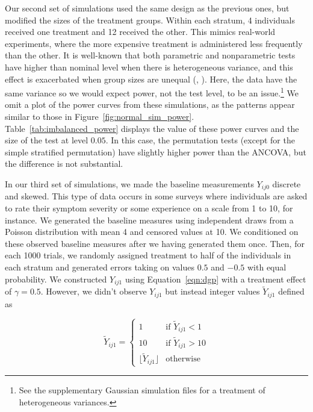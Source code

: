 \documentclass[11pt]{article}
\begin{document}
Our second set of simulations used the same design as the previous ones, but modified the sizes of the treatment groups.
Within each stratum, 4 individuals received one treatment and 12 received the other.
This mimics real-world experiments, where the more expensive treatment is administered less frequently than the other.
It is well-known that both parametric and nonparametric tests have higher than nominal level when there is heterogeneous variance, and this effect is exacerbated when group sizes are unequal (\cite{glass_consequences_1972}, \cite{zimmerman_two_2006}).
Here, the data have the same variance so we would expect power, not the test level, to be an issue.\footnote{
See the supplementary Gaussian simulation files for a treatment of heterogeneous variances.}
We omit a plot of the power curves from these simulations, as the patterns appear similar to those in Figure~\ref{fig:normal_sim_power}.
Table~\ref{tab:imbalanced_power} displays the value of these power curves and the size of the test at level $0.05$.
In this case, the permutation tests (except for the simple stratified permutation) have slightly higher power than the ANCOVA, but the difference is not substantial.
\begin{center}

\end{center}

In our third set of simulations, we made the baseline measurements $Y_{ij0}$ discrete and skewed.
This type of data occurs in some surveys where individuals are asked to rate their symptom severity or some experience on a scale from 1 to 10, for instance.
We generated the baseline measures using independent draws from a Poisson distribution with mean 4 and censored values at 10.
We conditioned on these observed baseline measures after we having generated them once.
Then, for each 1000 trials, we randomly assigned treatment to half of the individuals in each stratum and generated errors taking on values $0.5$ and $-0.5$ with equal probability.
We constructed $Y_{ij1}$ using Equation~\ref{eqn:dgp} with a treatment effect of $\gamma = 0.5$.
However, we didn't observe $Y_{ij1}$ but instead integer values $\tilde{Y}_{ij1}$ defined as 

\begin{displaymath}
   \tilde{Y}_{ij1} = \left\{
     \begin{array}{ll}
       1 & \text{if } \tilde{Y}_{ij1} < 1\\
       10 & \text{if } \tilde{Y}_{ij1} > 10 \\
       \lfloor \tilde{Y}_{ij1} \rfloor & \text{otherwise}
     \end{array}
   \right.
\end{displaymath}
\end{document}

